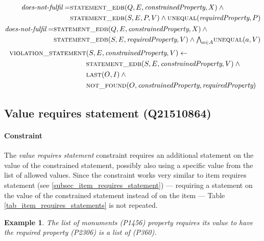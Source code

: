\documentclass[hyperref,bachelorofscience,fleqn]{cgvpub}
\newtheorem{example}{Example}
\begin{document}
\begin{align}
\begin{split}
\emph{does-not-fulfil} = &\textsc{statement\_edb}(Q, E, \emph{constrainedProperty}, X) \wedge{} \\
&\textsc{statement\_edb}(S, E, P, V) \wedge \textsc{unequal}(\emph{requiredProperty}, P)
\end{split} \\
\begin{split}
\emph{does-not-fulfil} = &\textsc{statement\_edb}(Q, E, \emph{constrainedProperty}, X) \wedge{} \\
&\textsc{statement\_edb}(S, E, \emph{requiredProperty}, V) \wedge {\textstyle\bigwedge}_{a \in A} \textsc{unequal}(a, V)
\end{split}
\end{align}
\begin{align}
\begin{split}
\textsc{violation\_statement}&(S, E, \emph{constrainedProperty}, V) \leftarrow \\
&\textsc{statement\_edb}(S, E, \emph{constrainedProperty}, V) \wedge{} \\
&\textsc{last}(O, I) \wedge{} \\
&\textsc{not\_found}(O, \emph{constrainedProperty}, \emph{requiredProperty})
\end{split}
\end{align}

\subsection{Value requires statement (Q21510864)}\label{subsec_value_requires_statement}
\paragraph{Constraint}
The \emph{value requires statement} constraint requires an additional statement on the value of the constrained statement, possibly also using a specific value from the list of allowed values. Since the constraint works very similar to item requires statement (see \ref{subsec_item_requires_statement}) --- requiring a statement on the value of the constrained statement instead of on the item --- Table \ref{tab_item_requires_statements} is not repeated.

\begin{example}
The \emph{list of monuments} (P1456) property requires its value to have the \emph{required property} (P2306) \emph{is a list of} (P360).
\end{example}
\end{document}
